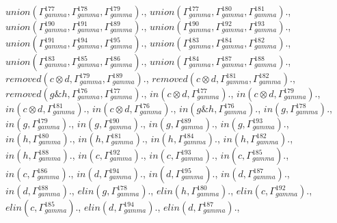 \documentclass[a4paper, 11pt]{article}
\begin{document}
$union(\Gamma_{gamma}^{177}, \Gamma_{gamma}^{178}, \Gamma_{gamma}^{179}).$, $union(\Gamma_{gamma}^{177}, \Gamma_{gamma}^{180}, \Gamma_{gamma}^{181}).$, $union(\Gamma_{gamma}^{190}, \Gamma_{gamma}^{191}, \Gamma_{gamma}^{189}).$, $union(\Gamma_{gamma}^{190}, \Gamma_{gamma}^{192}, \Gamma_{gamma}^{193}).$, $union(\Gamma_{gamma}^{191}, \Gamma_{gamma}^{194}, \Gamma_{gamma}^{195}).$, $union(\Gamma_{gamma}^{183}, \Gamma_{gamma}^{184}, \Gamma_{gamma}^{182}).$, $union(\Gamma_{gamma}^{183}, \Gamma_{gamma}^{185}, \Gamma_{gamma}^{186}).$, $union(\Gamma_{gamma}^{184}, \Gamma_{gamma}^{187}, \Gamma_{gamma}^{188}).$, $removed(c \otimes d, \Gamma_{gamma}^{179}, \Gamma_{gamma}^{189}).$, $removed(c \otimes d, \Gamma_{gamma}^{181}, \Gamma_{gamma}^{182}).$, $removed(g \binampersand h, \Gamma_{gamma}^{176}, \Gamma_{gamma}^{177}).$, $in(c \otimes d, \Gamma_{gamma}^{177}).$, $in(c \otimes d, \Gamma_{gamma}^{179}).$, $in(c \otimes d, \Gamma_{gamma}^{181}).$, $in(c \otimes d, \Gamma_{gamma}^{176}).$, $in(g \binampersand h, \Gamma_{gamma}^{176}).$, $in(g, \Gamma_{gamma}^{178}).$, $in(g, \Gamma_{gamma}^{179}).$, $in(g, \Gamma_{gamma}^{190}).$, $in(g, \Gamma_{gamma}^{189}).$, $in(g, \Gamma_{gamma}^{193}).$, $in(h, \Gamma_{gamma}^{180}).$, $in(h, \Gamma_{gamma}^{181}).$, $in(h, \Gamma_{gamma}^{184}).$, $in(h, \Gamma_{gamma}^{182}).$, $in(h, \Gamma_{gamma}^{188}).$, $in(c, \Gamma_{gamma}^{192}).$, $in(c, \Gamma_{gamma}^{193}).$, $in(c, \Gamma_{gamma}^{185}).$, $in(c, \Gamma_{gamma}^{186}).$, $in(d, \Gamma_{gamma}^{194}).$, $in(d, \Gamma_{gamma}^{195}).$, $in(d, \Gamma_{gamma}^{187}).$, $in(d, \Gamma_{gamma}^{188}).$, $elin(g, \Gamma_{gamma}^{178}).$, $elin(h, \Gamma_{gamma}^{180}).$, $elin(c, \Gamma_{gamma}^{192}).$, $elin(c, \Gamma_{gamma}^{185}).$, $elin(d, \Gamma_{gamma}^{194}).$, $elin(d, \Gamma_{gamma}^{187}).$, 
\end{document}
